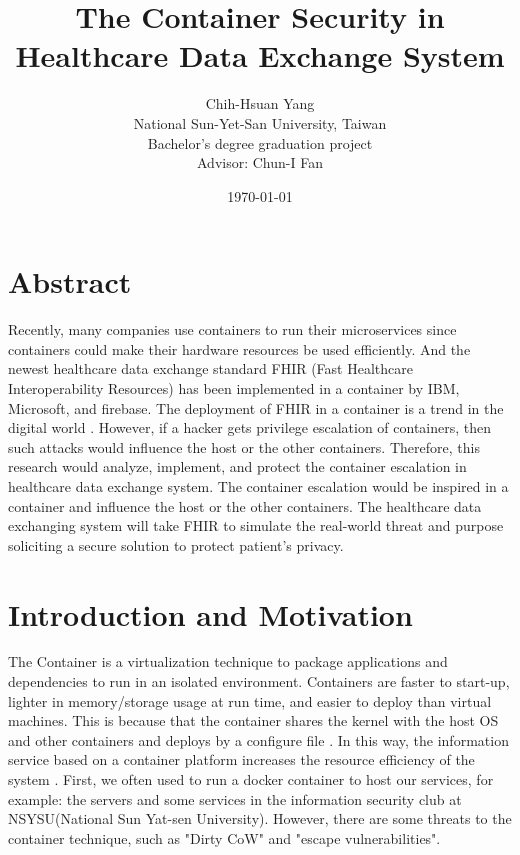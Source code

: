 \documentclass[12pt,a4paper]{article}
\title{{The Container Security in Healthcare Data Exchange System}}
\author{Chih-Hsuan Yang\\
National Sun-Yet-San University, Taiwan \\
Bachelor's degree graduation project \\
Advisor: Chun-I Fan
}
\date{\today}
\begin{document}
\section{Abstract}
Recently, many companies use containers to run their microservices since containers could
make their hardware resources be used efficiently. And the newest healthcare data exchange
standard FHIR (Fast Healthcare Interoperability Resources) \cite{FHIR_home} has been implemented
in a container by IBM, Microsoft, and firebase. The deployment of FHIR in a container is a
trend in the digital world \cite{Infrastructures}. However, if a hacker gets privilege
escalation of containers, then such attacks would influence the host or the other containers.
Therefore, this research would analyze, implement, and protect the container escalation
in healthcare data exchange system. The container escalation would be inspired in a container
and influence the host or the other containers. The healthcare data exchanging system will
take FHIR to simulate the real-world threat and purpose soliciting a secure solution to
protect patient's privacy.


\section{Introduction and Motivation}
The Container is a virtualization technique to package applications and dependencies to run in
an isolated environment. Containers are faster to start-up, lighter in memory/storage usage
at run time, and easier to deploy than virtual machines. This is because that the container
shares the kernel with the host OS and other containers and deploys by a configure file
\cite{Offloading}. In this way, the information service based on a container platform increases
the resource efficiency of the system \cite{Comparison}.
First, we often used to run a docker container to host our services, for example: the
servers and some services in the information security club at NSYSU(National Sun Yat-sen University).
However, there are some threats to the container technique, such as "Dirty CoW" \cite{Dirty_CoW}
and "escape vulnerabilities".\\
\end{document}
